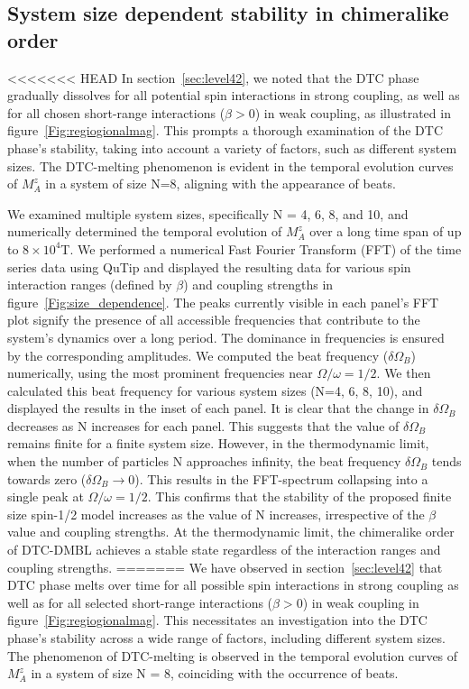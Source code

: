 \documentclass[12pt]{iopart}
\begin{document}
\subsection{\label{sec:level43} System size dependent stability in chimeralike order}
<<<<<<< HEAD
In section~\ref{sec:level42}, we noted that the DTC phase gradually dissolves for all potential spin interactions in strong coupling, as well as for all chosen short-range interactions ($\beta > 0$) in weak coupling, as illustrated in figure~\ref{Fig:regiogionalmag}. This prompts a thorough examination of the DTC phase's stability, taking into account a variety of factors, such as different system sizes. The DTC-melting phenomenon is evident in the temporal evolution curves of $M^z_A$ in a system of size N=8, aligning with the appearance of beats.

We examined multiple system sizes, specifically N = 4, 6, 8, and 10, and numerically determined the temporal evolution of $M^z_A$ over a long time span of up to $8\times10^4$T. We performed a numerical Fast Fourier Transform (FFT) of the time series data using QuTip \cite{Johansson2013} and displayed the resulting data for various spin interaction ranges (defined by $\beta$) and coupling strengths in figure~\ref{Fig:size_dependence}. The peaks currently visible in each panel's FFT plot signify the presence of all accessible frequencies that contribute to the system's dynamics over a long period. The dominance in frequencies is ensured by the corresponding amplitudes. We computed the beat frequency ($\delta\Omega_B$) numerically, using the most prominent frequencies near $\Omega/\omega = 1/2$. We then calculated this beat frequency for various system sizes (N=4, 6, 8, 10), and displayed the results in the inset of each panel. It is clear that the change in $\delta\Omega_B$ decreases as N increases for each panel. This suggests that the value of $\delta\Omega_B$ remains finite for a finite system size. However, in the thermodynamic limit, when the number of particles N approaches infinity, the beat frequency $\delta\Omega_B$ tends towards zero ($\delta\Omega_B\rightarrow 0$). This results in the FFT-spectrum collapsing into a single peak at $\Omega/\omega = 1/2$. This confirms that the stability of the proposed finite size spin-1/2 model increases as the value of N increases, irrespective of the $\beta$ value and coupling strengths. At the thermodynamic limit, the chimeralike order of DTC-DMBL achieves a stable state regardless of the interaction ranges and coupling strengths.
=======
We have observed in section~\ref{sec:level42} that DTC phase melts over time for all possible spin interactions in strong coupling as well as for all selected short-range interactions ($\beta > 0$) in weak coupling in figure~\ref{Fig:regiogionalmag}. This necessitates an investigation into the DTC phase's stability across a wide range of factors, including different system sizes. The phenomenon of DTC-melting is observed in the temporal evolution curves of $M^z_A$ in a system of size N = 8, coinciding with the occurrence of beats.
\end{document}
